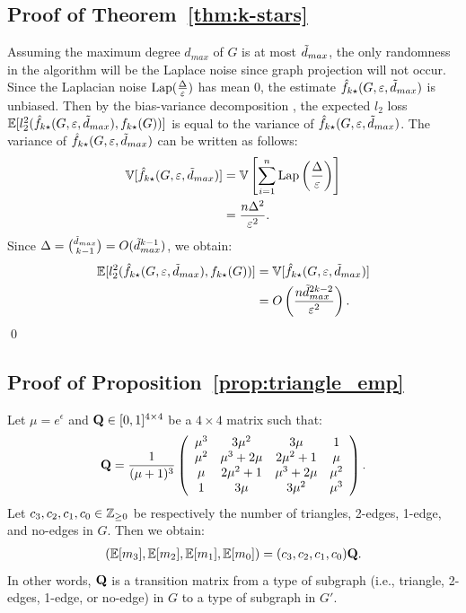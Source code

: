 {\subsection{Proof of Theorem~\ref{thm:k-stars}}
Assuming the maximum degree $d_{max}$ of $G$ is at most $\tilde{d}_{max}$, the only
randomness in the algorithm will be the Laplace noise since graph projection
will not occur.
Since the Laplacian noise $\textrm{Lap}(\frac{\Delta}{\varepsilon})$ has mean $0$, the estimate $\hat{f}_{k\star}(G, \varepsilon, \tilde{d}_{max})$ is unbiased. 
Then by the bias-variance decomposition \cite{mlpp}, 
the expected $l_2$ loss 
$\mathbb{E}[l_2^2(\hat{f}_{k\star}(G, \varepsilon, \tilde{d}_{max}),\allowbreak f_{k\star}(G))]$ is equal to the variance of $\hat{f}_{k\star}(G, \varepsilon, \tilde{d}_{max})$. 
The variance of $\hat{f}_{k\star}(G, \varepsilon, \tilde{d}_{max})$ can be written as follows:
\begin{align*}
    \mathbb{V}[\hat{f}_{k\star}(G, \varepsilon, \tilde{d}_{max})] 
    &= \mathbb{V}\left[ \sum_{i=1}^n \textrm{Lap}\left( \frac{\Delta}{\varepsilon} \right) \right] \\
    &= \frac{n \Delta^2}{\varepsilon^2}.
\end{align*}
Since $\Delta = \binom{\tilde{d}_{max}}{k-1} = O(\tilde{d}_{max}^{k-1})$, we obtain:
\begin{align*}
    \mathbb{E}[l_2^2(\hat{f}_{k\star}(G, \varepsilon, \tilde{d}_{max}), f_{k\star}(G))] 
    &= \mathbb{V}[\hat{f}_{k\star}(G, \varepsilon, \tilde{d}_{max})] \\
    &= O\left(\frac{n \tilde{d}_{max}^{2k-2}}{\varepsilon^2}\right).
\end{align*}
\qed

\subsection{Proof of Proposition~\ref{prop:triangle_emp}}
Let $\mu = e^\epsilon$ and $\mathbf{Q} \in [0,1]^{4 \times 4}$ be a $4 \times 4$ matrix such that:
\begin{align}
  \mathbf{Q} = \frac{1}{(\mu+1)^3} \left(
    \begin{array}{cccc}
      \mu^3 & 3\mu^2 & 3\mu & 1 \\
      \mu^2 & \mu^3+2\mu & 2\mu^2+1 & \mu \\
      \mu & 2\mu^2+1 & \mu^3+2\mu & \mu^2 \\
      1 & 3\mu & 3\mu^2 & \mu^3
    \end{array}
  \right).
  \label{eq:Q_1}
\end{align}
Let $c_3, c_2, c_1, c_0 \in \mathbb{Z}_{\ge0}$ be respectively the number of triangles, 2-edges, 1-edge, and no-edges in $G$. 
Then we obtain:
\begin{align}
(\mathbb{E}[m_3], \mathbb{E}[m_2], \mathbb{E}[m_1],
\mathbb{E}[m_0]) = (c_3, c_2, c_1, c_0) \mathbf{Q}.
\label{eq:bmQ}
\end{align}
In other words, $\mathbf{Q}$ is a transition matrix from a type of subgraph (i.e., triangle, 2-edges, 1-edge, or no-edge) in $G$ to a type of subgraph in $G'$. 

}
